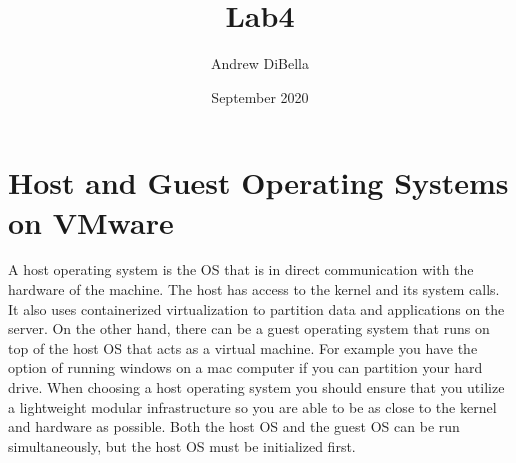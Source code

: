 \documentclass{article}
\title{Lab4}
\author{Andrew DiBella }
\date{September 2020}
\begin{document}
\maketitle

\section{Host and Guest Operating Systems on VMware}
A host operating system is the OS that is in direct communication with the hardware of the machine. The host has access to the kernel and its system calls. It also uses containerized virtualization to partition data and applications on the server. On the other hand, there can be a guest operating system that runs on top of the host OS that acts as a virtual machine. For example you have the option of running windows on a mac computer if you can partition your hard drive. When choosing a host operating system you should ensure that you utilize a lightweight modular infrastructure so you are able to be as close to the kernel and hardware as possible. Both the host OS and the guest OS can be run simultaneously, but the host OS must be initialized first. 
\end{document}
